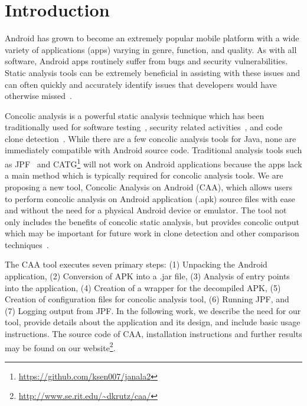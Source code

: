 \documentclass{sig-alternate-05-2015}
\begin{document}





\section{Introduction}


Android has grown to become an extremely popular mobile platform with a wide variety of applications (apps) varying in genre, function, and quality. As with all software, Android apps routinely suffer from bugs and security vulnerabilities. Static analysis tools can be extremely beneficial in assisting with these issues and can often quickly and accurately identify issues that developers would have otherwise missed~\cite{Ware:2008:SJC:1394504.1394506, Feng:2014:ASD:2635868.2635869}.

Concolic analysis is a powerful static analysis technique which has been traditionally used for software testing~\cite{Sen:2005:CCU:1081706.1081750}, security related activities~\cite{Chen:2014:CIB:2554850.2554875}, and code clone detection~\cite{Krutz_Sac15, 6671332}. While there are a few concolic analysis tools for Java, none are immediately compatible with Android source code. Traditional analysis tools such as JPF~\cite{visser2003model} and CATG\footnote{\url{https://github.com/ksen007/janala2}} will not work on Android applications because the apps lack a main method which is typically required for concolic analysis tools. We are proposing a new tool, Concolic Analysis on Android (CAA), which allows users to perform concolic analysis on Android application (.apk) source files with ease and without the need for a physical Android device or emulator. The tool not only includes the benefits of concolic static analysis, but provides concolic output which may be important for future work in clone detection and other comparison techniques~\cite{Krutz_Sac15, 6671332,Anand:2012:ACT:2393596.2393666}.

The CAA tool executes seven primary steps: (1) Unpacking the Android application, (2) Conversion of APK into a .jar file, (3) Analysis of entry points into the application, (4) Creation of a wrapper for the decompiled APK, (5) Creation of configuration files for concolic analysis tool, (6) Running JPF, and (7) Logging output from JPF. In the following work, we describe the need for our tool, provide details about the application and its design, and include basic usage instructions. The source code of CAA, installation instructions and further results may be found on our website\footnote{\url{http://www.se.rit.edu/~dkrutz/caa/}}.
\end{document}
